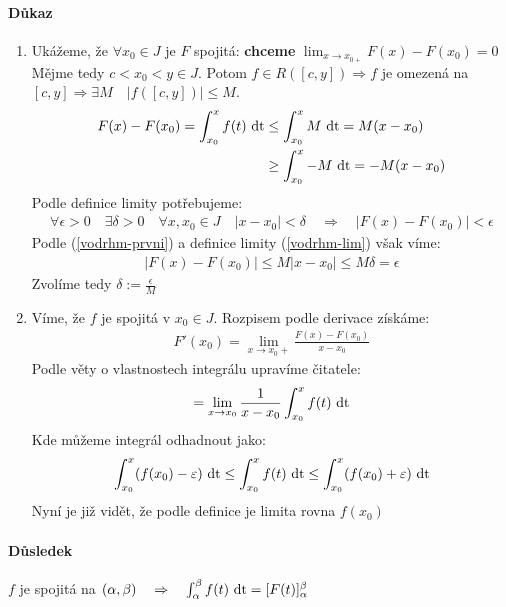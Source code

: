 \documentclass[a4paper,10pt]{article}
\begin{document}
\paragraph{Důkaz}
\begin{enumerate}
	\item Ukážeme, že $\forall x_0 \in J$ je $F$ spojitá: 
		\textbf{chceme} $\lim_{x\to x_{0+}} F(x) - F(x_0)=0$\\
		Mějme tedy $c < x_0 < y \in J$. Potom $f \in R([c,y]) \Rightarrow f $ je omezená na $[c,y]
		\Rightarrow \exists M \quad |f([c,y])| \le M $.\\
		\begin{align}
			\label{vodrhm-prvni} F(x) - F(x_0) = \int_{x_0}^x f(t) \operatorname*{\,dt} & \le \int_{x_0}^x M \operatorname*{\,dt} =
			M(x-x_0)\\
			&\ge \int_{x_0}^x - M \operatorname*{\,dt} = -M (x - x_0)
		\end{align}
		Podle definice limity potřebujeme:
		\begin{align}
			\label{vodrhm-lim}\forall \epsilon > 0 \quad \exists \delta > 0 \quad \forall x,x_0
			\in J \quad |x-x_0| < \delta \quad \Rightarrow  \quad |F(x) -
			F(x_0)| < \epsilon
		\end{align}
		Podle (\ref{vodrhm-prvni}) a definice limity (\ref{vodrhm-lim}) však
		víme:
		\begin{align}
			|F(x) - F(x_0)| \le M|x-x_0| \le M\delta = \epsilon
		\end{align}
		Zvolíme tedy $\delta := \frac{\epsilon}{M}$
	\item Víme, že $f$ je spojitá v $x_0 \in J$. Rozpisem podle derivace
		získáme:
		\begin{align}
			F'(x_0) = \lim_{x \to x_0 + } \frac{F(x) - F(x_0)}{x-x_0}
		\end{align}
		Podle věty o vlastnostech integrálu upravíme čitatele:
		\begin{align}
			= \lim_{x \to x_0} \frac{1}{x - x_0} \int_{x_0}^x f(t) \operatorname*{\,dt}
		\end{align}
		Kde můžeme integrál odhadnout jako:
		\begin{align}
			 \int_{x_0}^x (f(x_0)-\varepsilon) \operatorname*{\,dt}
			 \le \int_{x_0}^x f(t) \operatorname*{\,dt} 
			 \le \int_{x_0}^x (f(x_0)+\varepsilon) \operatorname*{\,dt}
		\end{align}
		Nyní je již vidět, že podle definice je limita rovna $f(x_0)$
\end{enumerate}
\paragraph{Důsledek}
$f$ je spojitá na $(\alpha, \beta) \quad  \Rightarrow \quad \int_\alpha^\beta f(t) \operatorname*{\,dt} =
[F(t)]_\alpha^\beta$
\end{document}
